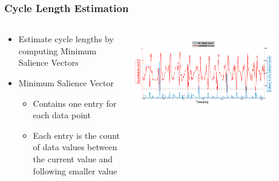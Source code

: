 \documentclass{beamer}
\begin{document}
\begin{frame}
  \frametitle{Cycle Length Estimation}
  \begin{columns}
  \begin{column}{.5\textwidth}
  \begin{itemize}
  	\item Estimate cycle lengths by computing Minimum Salience Vectors
  	\linebreak
  	\item Minimum Salience Vector
  		\begin{itemize}
  			\item Contains one entry for each data point
  			\item Each entry is the count of data values between the current value and following smaller value
  		\end{itemize}
  \end{itemize}
  \end{column}
    \begin{column}{0.7\textwidth}
   \includegraphics[width=0.8\textwidth]{Illustrations/svector.png}
       \\
  \end{column}
  \end{columns}
\end{frame}
\end{document}
